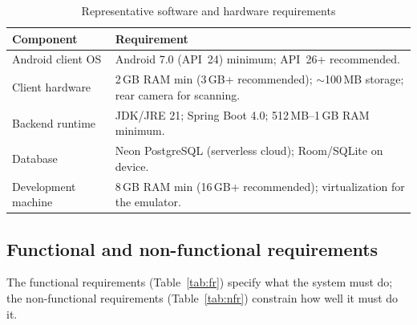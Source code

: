 \documentclass[13pt,a4paper]{extarticle}
\begin{document}
\begin{table}[H]
\centering
\caption{Representative software and hardware requirements}
\label{tab:sysreq}
\renewcommand{\arraystretch}{1.2}
\begin{tabularx}{\textwidth}{@{}l X@{}}
\toprule
\textbf{Component} & \textbf{Requirement} \\
\midrule
Android client OS  & Android 7.0 (API~24) minimum; API~26+ recommended. \\
Client hardware    & 2\,GB RAM min (3\,GB+ recommended); $\sim$100\,MB storage; rear camera for scanning. \\
Backend runtime    & JDK/JRE 21; Spring Boot 4.0; 512\,MB--1\,GB RAM minimum. \\
Database           & Neon PostgreSQL (serverless cloud); Room/SQLite on device. \\
Development machine & 8\,GB RAM min (16\,GB+ recommended); virtualization for the emulator. \\
\bottomrule
\end{tabularx}
\end{table}

\subsection{Functional and non-functional requirements}
The functional requirements (Table~\ref{tab:fr}) specify what the system must do; the
non-functional requirements (Table~\ref{tab:nfr}) constrain how well it must do it.
\end{document}
